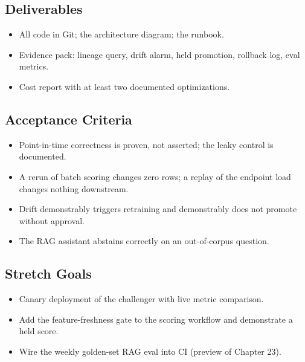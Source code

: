 \subsection*{Deliverables}
\begin{itemize}
    \item All code in Git; the architecture diagram; the runbook.
    \item Evidence pack: lineage query, drift alarm, held promotion, rollback log, eval metrics.
    \item Cost report with at least two documented optimizations.
\end{itemize}

\subsection*{Acceptance Criteria}
\begin{itemize}
    \item Point-in-time correctness is proven, not asserted; the leaky control is documented.
    \item A rerun of batch scoring changes zero rows; a replay of the endpoint load changes nothing downstream.
    \item Drift demonstrably triggers retraining and demonstrably does not promote without approval.
    \item The RAG assistant abstains correctly on an out-of-corpus question.
\end{itemize}

\subsection*{Stretch Goals}
\begin{itemize}
    \item Canary deployment of the challenger with live metric comparison.
    \item Add the feature-freshness gate to the scoring workflow and demonstrate a held score.
    \item Wire the weekly golden-set RAG eval into CI (preview of Chapter 23).
\end{itemize}
